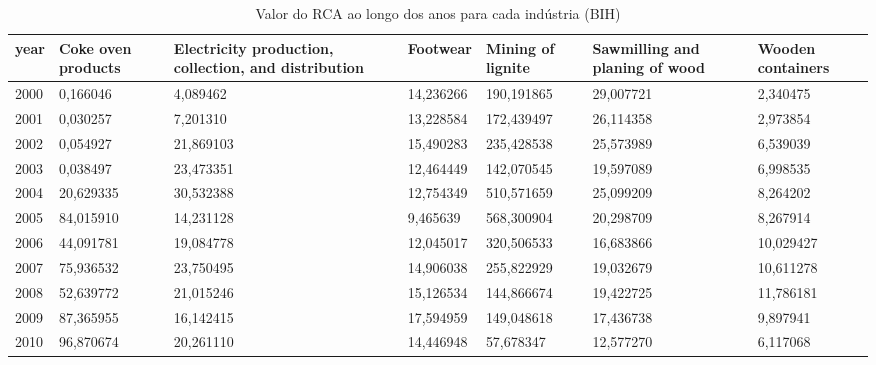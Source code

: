 \begin{table}
\centering
\caption{Valor do RCA ao longo dos anos para cada indústria (BIH)}
\begin{tabular}{p{1cm}p{2cm}p{2cm}p{2cm}p{2cm}p{2cm}p{2cm}}
\toprule
 year &  Coke oven products &  Electricity production, collection, and distribution &  Footwear &  Mining of lignite &  Sawmilling and planing of wood &  Wooden containers \\
\midrule
 2000 &            0,166046 &                                           4,089462 & 14,236266 &         190,191865 &                       29,007721 &           2,340475 \\
 2001 &            0,030257 &                                           7,201310 & 13,228584 &         172,439497 &                       26,114358 &           2,973854 \\
 2002 &            0,054927 &                                          21,869103 & 15,490283 &         235,428538 &                       25,573989 &           6,539039 \\
 2003 &            0,038497 &                                          23,473351 & 12,464449 &         142,070545 &                       19,597089 &           6,998535 \\
 2004 &           20,629335 &                                          30,532388 & 12,754349 &         510,571659 &                       25,099209 &           8,264202 \\
 2005 &           84,015910 &                                          14,231128 &  9,465639 &         568,300904 &                       20,298709 &           8,267914 \\
 2006 &           44,091781 &                                          19,084778 & 12,045017 &         320,506533 &                       16,683866 &          10,029427 \\
 2007 &           75,936532 &                                          23,750495 & 14,906038 &         255,822929 &                       19,032679 &          10,611278 \\
 2008 &           52,639772 &                                          21,015246 & 15,126534 &         144,866674 &                       19,422725 &          11,786181 \\
 2009 &           87,365955 &                                          16,142415 & 17,594959 &         149,048618 &                       17,436738 &           9,897941 \\
 2010 &           96,870674 &                                          20,261110 & 14,446948 &          57,678347 &                       12,577270 &           6,117068 \\

\end{tabular}
\end{table}

